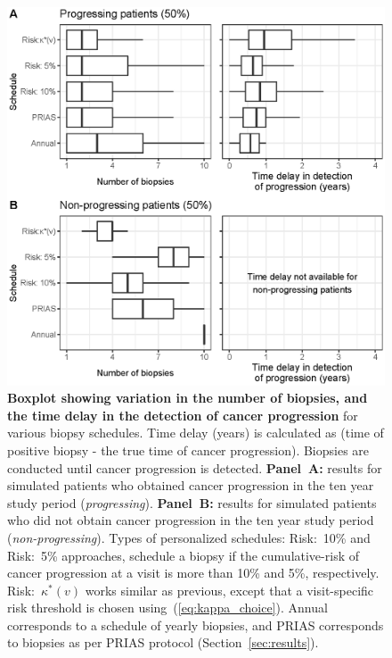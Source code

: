 \begin{figure}
\centerline{\includegraphics{images/simulation_boxplot.eps}}
\caption{\textbf{Boxplot showing variation in the number of biopsies, and the time delay in the detection of cancer progression} for various biopsy schedules. Time delay (years) is calculated as (time of positive biopsy - the true time of cancer progression). Biopsies are conducted until cancer progression is detected. \textbf{Panel~A:} results for simulated patients who obtained cancer progression in the ten year study period (\textit{progressing}). \textbf{Panel~B:} results for simulated patients who did not obtain cancer progression in the ten year study period (\textit{non-progressing}). Types of personalized schedules: Risk:~10\% and Risk:~5\% approaches, schedule a biopsy if the cumulative-risk of cancer progression at a visit is more than 10\% and 5\%, respectively. Risk:~$\kappa^*(v)$ works similar as previous, except that a visit-specific risk threshold is chosen using~(\ref{eq:kappa_choice}). Annual corresponds to a schedule of yearly biopsies, and PRIAS corresponds to biopsies as per PRIAS protocol (Section~\ref{sec:results}).}
\label{fig:simulation_boxplot}
\end{figure}